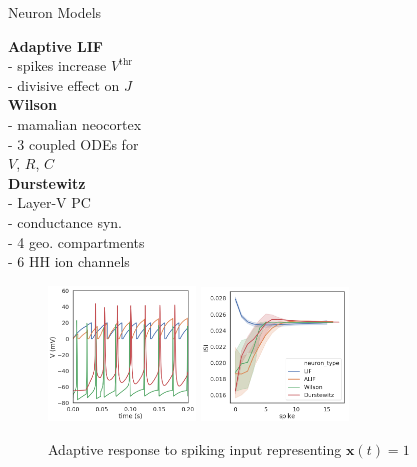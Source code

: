 \documentclass[aspectratio=169]{beamer}
\begin{document}
\begin{frame}{Neuron Models}
\centering
\begin{multicols}{3}
\textbf{Adaptive LIF} \\
\vspace{0.2cm}
- spikes increase $V^{\text{thr}}$ \\
\vspace{0.1cm}
- divisive effect on $J$ \\
\columnbreak
\textbf{Wilson} \\
\vspace{0.2cm}
- mamalian neocortex \\  %
\vspace{0.1cm}
- 3 coupled ODEs for \\
$V$, $R$, $C$ \\
\columnbreak
\textbf{Durstewitz} \\
\vspace{0.2cm}
- Layer-V PC \\
- conductance syn. \\
- 4 geo. compartments \\
- 6 HH ion channels \\  %
\end{multicols}
\vspace{-0.2cm}
\begin{figure}
    \centering
    \includegraphics[width=0.35\textwidth]{media/v_compare.png} \hspace{1.5cm}
    \includegraphics[width=0.35\textwidth]{media/isi_compare.png}
    \caption{Adaptive response to spiking input representing $\mathbf{x}(t)=1$}
\end{figure}
\end{frame}
\end{document}
